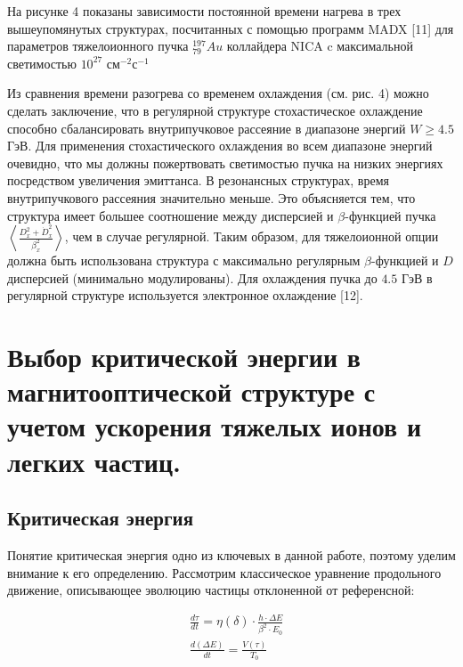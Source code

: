 \noindent На рисунке 4 показаны зависимости постоянной времени нагрева в трех вышеупомянутых структурах, посчитанных с помощью программ MADX [11] для параметров тяжелоионного пучка ${_{79}^{197}}Au$ коллайдера NICA c максимальной светимостью ${10}^{27}$ см$^{-2}$с$^{-1}$

\noindent Из сравнения времени разогрева со временем охлаждения (см. рис. 4) можно сделать заключение, что в регулярной структуре стохастическое охлаждение способно сбалансировать внутрипучковое рассеяние в диапазоне энергий $W\geq4.5$ ГэВ. Для применения стохастического охлаждения во всем диапазоне энергий очевидно, что мы должны пожертвовать светимостью пучка на низких энергиях посредством увеличения эмиттанса. В резонансных структурах, время внутрипучкового рассеяния значительно меньше. Это объясняется тем, что структура имеет большее соотношение между дисперсией и $\beta$-функцией пучка $\left\langle\frac{D_x^2+{\dot{D}}_x^2}{\beta_x^2}\right\rangle$, чем в случае регулярной. Таким образом, для тяжелоионной опции должна быть использована структура с максимально регулярным $\beta$-функцией и $D$ дисперсией (минимально модулированы). Для охлаждения пучка до $4.5$ ГэВ в регулярной структуре используется электронное охлаждение [12].

\section{Выбор критической энергии в магнитооптической структуре с учетом ускорения тяжелых ионов и легких частиц.}\label{sec:ch:ions_light/transition}

\subsection{Критическая энергия}\label{sec:ch:ions_light/transition/energy}
\par Понятие критическая энергия одно из ключевых в данной работе, поэтому уделим внимание к его определению. 
\noindent Рассмотрим классическое уравнение продольного движение, описывающее эволюцию частицы отклоненной от референсной:

\begin{equation}
\begin{aligned}
& \frac{d \tau}{d t}=\eta(\delta) \cdot \frac{h \cdot \Delta E}{\beta^2 \cdot E_0} \\
& \frac{d(\Delta E)}{d t}=\frac{V(\tau)}{T_0}
\end{aligned}
\label{eq:long_motion_eq}
\end{equation}

